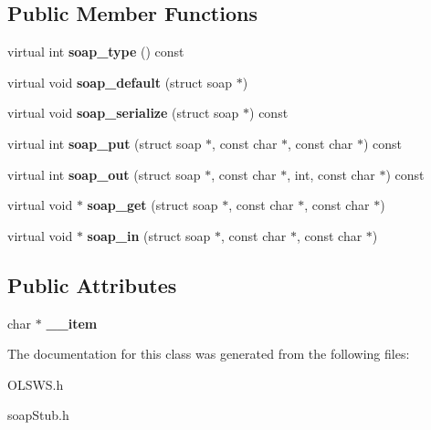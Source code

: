 \subsection*{Public Member Functions}
\begin{DoxyCompactItemize}
\item 
\hypertarget{classxsd____anyType_ad1b8fec060010cc1f51509815e61cbf2}{
virtual int {\bfseries soap\_\-type} () const }
\label{classxsd____anyType_ad1b8fec060010cc1f51509815e61cbf2}

\item 
\hypertarget{classxsd____anyType_a3382d31b49a88f9291b96ef12d55d386}{
virtual void {\bfseries soap\_\-default} (struct soap $\ast$)}
\label{classxsd____anyType_a3382d31b49a88f9291b96ef12d55d386}

\item 
\hypertarget{classxsd____anyType_a769ed51ed28f6c6f7f475e9d2346a1a8}{
virtual void {\bfseries soap\_\-serialize} (struct soap $\ast$) const }
\label{classxsd____anyType_a769ed51ed28f6c6f7f475e9d2346a1a8}

\item 
\hypertarget{classxsd____anyType_a8faaa084be7c20cbf34a4e4c6bf13e8f}{
virtual int {\bfseries soap\_\-put} (struct soap $\ast$, const char $\ast$, const char $\ast$) const }
\label{classxsd____anyType_a8faaa084be7c20cbf34a4e4c6bf13e8f}

\item 
\hypertarget{classxsd____anyType_a45bc40916e995c54e309ac4c014c3fa3}{
virtual int {\bfseries soap\_\-out} (struct soap $\ast$, const char $\ast$, int, const char $\ast$) const }
\label{classxsd____anyType_a45bc40916e995c54e309ac4c014c3fa3}

\item 
\hypertarget{classxsd____anyType_adbf1656fab273946db1765458680ad78}{
virtual void $\ast$ {\bfseries soap\_\-get} (struct soap $\ast$, const char $\ast$, const char $\ast$)}
\label{classxsd____anyType_adbf1656fab273946db1765458680ad78}

\item 
\hypertarget{classxsd____anyType_a42bb915ab04b2922dcf044cdf6828885}{
virtual void $\ast$ {\bfseries soap\_\-in} (struct soap $\ast$, const char $\ast$, const char $\ast$)}
\label{classxsd____anyType_a42bb915ab04b2922dcf044cdf6828885}

\end{DoxyCompactItemize}
\subsection*{Public Attributes}
\begin{DoxyCompactItemize}
\item 
\hypertarget{classxsd____anyType_ac7f4b8263bf1f471b1d8e4834f56f11b}{
char $\ast$ {\bfseries \_\-\_\-item}}
\label{classxsd____anyType_ac7f4b8263bf1f471b1d8e4834f56f11b}

\end{DoxyCompactItemize}


The documentation for this class was generated from the following files:\begin{DoxyCompactItemize}
\item 
OLSWS.h\item 
soapStub.h\end{DoxyCompactItemize}
